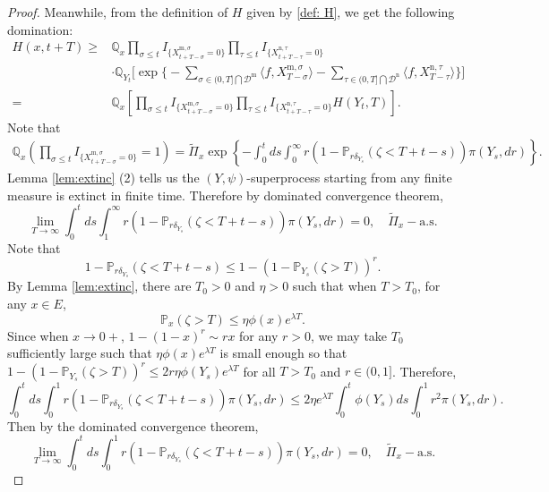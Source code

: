 \documentclass[12pt,a4paper]{amsart}
\numberwithin{equation}{section}
\theoremstyle{plain}
\theoremstyle{definition}
\theoremstyle{remark}
\begin{document}
\begin{proof}
Meanwhile, from the definition of $H$ given by
\eqref{def: H}, we get the following domination:
\begin{equation}\label{subsub}
\begin{aligned}
     H(x,t+T)\geq& \mathbb Q_{x}\prod_{\sigma\leq t}I_{\{ X_{t+T-\sigma}^{{\mathrm m},\sigma}=0\}}\prod_{\tau\leq t}I_{\{ X_{t+T-\tau}^{{\mathrm n},\tau}=0\}}\\
&\cdot\mathbb Q_{Y_t}\Big[\exp\Big\{-\sum_{\sigma\in (0, T]\bigcap \mathcal D^{\mathrm m}}\langle f, X_{T-\sigma}^{{\mathrm m},\sigma}\rangle -\sum_{\tau\in (0, T]\bigcap \mathcal D^{\mathrm n}}\langle f, X_{T-\tau}^{{\mathrm n},\tau}\rangle \Big\}\Big]\\
=& \mathbb Q_{x}\left[\prod_{\sigma\leq t}I_{\{ X_{t+T-\sigma}^{{\mathrm m},\sigma}=0\}}\prod_{\tau\leq t}I_{\{ X_{t+T-\tau}^{{\mathrm n},\tau}=0\}}H(Y_t, T)\right].
\end{aligned}
\end{equation}
Note that
\begin{eqnarray*}
\mathbb Q_{x}\left(\prod_{\sigma\leq t}I_{\{ X_{t+T-\sigma}^{{\mathrm m},\sigma}=0\}}=1\right)
=\widetilde\Pi_x\exp\left\{-\int_0^tds\int_0^\infty r(1-\mathbb P_{r\delta_{Y_s}}(\zeta<T+t-s))\pi(Y_s,dr)\right\}.
\end{eqnarray*}
Lemma \ref{lem:extinc} (2) tells us the $(Y,\psi)$-superprocess starting from any finite measure is extinct in finite time.  Therefore
 by dominated convergence theorem,
\begin{equation}\label{1infty limit}
\lim_{T\rightarrow\infty}\int_0^tds\int_1^\infty r(1-\mathbb P_{r\delta_{Y_s}}(\zeta<T+t-s))\pi(Y_s,dr)=0,\quad \widetilde\Pi_x-\mbox{a.s.}
\end{equation}
  Note that
\[
1-\mathbb P_{r\delta_{Y_s}}(\zeta<T+t-s)\leq 1-(1-\mathbb P_{Y_s}(\zeta>T))^r.
\]
By Lemma \ref{lem:extinc}, there are $T_0>0$ and $\eta>0$ such that when $T>T_0$, for any $x\in E$,
\[
\mathbb P_x(\zeta>T)\leq \eta \phi(x)e^{\lambda T}.
\]
Since when $x\rightarrow 0+$, $1-(1-x)^r\sim rx$ for any $r>0$, we may take $T_0$  sufficiently large such that
$\eta \phi(x)e^{\lambda T}$ is small enough so that $1-(1-\mathbb P_{Y_s}(\zeta>T))^r\leq 2r\eta \phi(Y_s)e^{\lambda T}$ for all  $T>T_0$ and $r\in(0,1]$.
Therefore,
\[
\int_0^tds\int_0^1 r(1-\mathbb P_{r\delta_{ Y_s}}(\zeta<T+t-s))\pi(Y_s,dr)\leq 2\eta e^{\lambda T}\int_0^t\phi(Y_s)ds\int_0^1 r^2 \pi(Y_s,dr).
\]
Then by the dominated convergence theorem,
\begin{equation}\label{01limit}
\lim_{T\rightarrow\infty}\int_0^tds\int_0^1 r(1-\mathbb P_{r\delta_{Y_s}}(\zeta<T+t-s))\pi(Y_s,dr)=0, \quad \widetilde\Pi_x-\mbox{a.s.}

\end{equation}
\end{proof}
\end{document}

